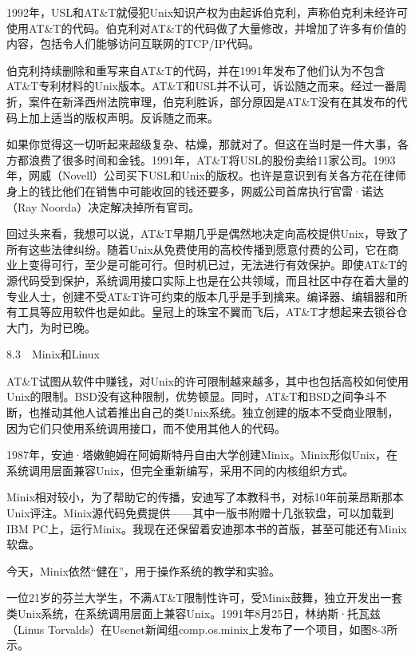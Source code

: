 \documentclass[a4paper,12pt,UTF8,twoside]{ctexbook}
\begin{document}
{{1992年，USL和AT\&T就侵犯Unix知识产权为由起诉伯克利，声称伯克利未经许可使用AT\&T的代码。伯克利对AT\&T的代码做了大量修改，并增加了许多有价值的内容，包括令人们能够访问互联网的TCP/IP代码。

伯克利持续删除和重写来自AT\&T的代码，并在1991年发布了他们认为不包含AT\&T专利材料的Unix版本。AT\&T和USL并不认可，诉讼随之而来。经过一番周折，案件在新泽西州法院审理，伯克利胜诉，部分原因是AT\&T没有在其发布的代码上加上适当的版权声明。反诉随之而来。

如果你觉得这一切听起来超级复杂、枯燥，那就对了。但这在当时是一件大事，各方都浪费了很多时间和金钱。1991年，AT\&T将USL的股份卖给11家公司。1993年，网威（Novell）公司买下USL和Unix的版权。也许是意识到有关各方花在律师身上的钱比他们在销售中可能收回的钱还要多，网威公司首席执行官雷·诺达（Ray Noorda）决定解决掉所有官司。

回过头来看，我想可以说，AT\&T早期几乎是偶然地决定向高校提供Unix，导致了所有这些法律纠纷。随着Unix从免费使用的高校传播到愿意付费的公司，它在商业上变得可行，至少是可能可行。但时机已过，无法进行有效保护。即使AT\&T的源代码受到保护，系统调用接口实际上也是在公共领域，而且社区中存在着大量的专业人士，创建不受AT\&T许可约束的版本几乎是手到擒来。编译器、编辑器和所有工具等应用软件也是如此。皇冠上的珠宝不翼而飞后，AT\&T才想起来去锁谷仓大门，为时已晚。





8.3　Minix和Linux


AT\&T试图从软件中赚钱，对Unix的许可限制越来越多，其中也包括高校如何使用Unix的限制。BSD没有这种限制，优势顿显。同时，AT\&T和BSD之间争斗不断，也推动其他人试着推出自己的类Unix系统。独立创建的版本不受商业限制，因为它们只使用系统调用接口，而不使用其他人的代码。

1987年，安迪·塔嫩鲍姆在阿姆斯特丹自由大学创建Minix。Minix形似Unix，在系统调用层面兼容Unix，但完全重新编写，采用不同的内核组织方式。

Minix相对较小，为了帮助它的传播，安迪写了本教科书，对标10年前莱昂斯那本Unix评注。Minix源代码免费提供——其中一版书附赠十几张软盘，可以加载到IBM PC上，运行Minix。我现在还保留着安迪那本书的首版，甚至可能还有Minix软盘。

今天，Minix依然“健在”，用于操作系统的教学和实验。

一位21岁的芬兰大学生，不满AT\&T限制性许可，受Minix鼓舞，独立开发出一套类Unix系统，在系统调用层面上兼容Unix。1991年8月25日，林纳斯·托瓦兹（Linus Torvalds）在Usenet新闻组comp.os.minix上发布了一个项目，如图8-3所示。



}}
\end{document}
